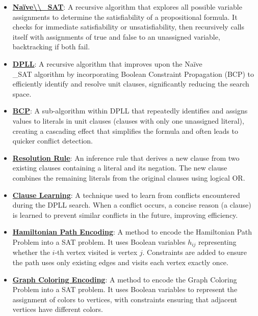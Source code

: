 \documentclass{article}%
\begin{document}
\begin{itemize}[leftmargin=*]%
\item \href{https://www.math.purdue.edu/~yipn/351/15L2-SAT.pdf#page=18}{\textbf{Naïve\textbackslash{}\textbackslash{}\_SAT}}: A recursive algorithm that explores all possible variable assignments to determine the satisfiability of a propositional formula. It checks for immediate satisfiability or unsatisfiability, then recursively calls itself with assignments of true and false to an unassigned variable, backtracking if both fail.%
\item \href{https://www.math.purdue.edu/~yipn/351/15L2-SAT.pdf#page=17}{\textbf{DPLL}}: A recursive algorithm that improves upon the Naïve\\_SAT algorithm by incorporating Boolean Constraint Propagation (BCP) to efficiently identify and resolve unit clauses, significantly reducing the search space.%
\item \href{https://www.math.purdue.edu/~yipn/351/15L2-SAT.pdf#page=20}{\textbf{BCP}}: A sub-algorithm within DPLL that repeatedly identifies and assigns values to literals in unit clauses (clauses with only one unassigned literal), creating a cascading effect that simplifies the formula and often leads to quicker conflict detection.%
\item \href{https://www.math.purdue.edu/~yipn/351/15L2-SAT.pdf#page=32}{\textbf{Resolution Rule}}: An inference rule that derives a new clause from two existing clauses containing a literal and its negation. The new clause combines the remaining literals from the original clauses using logical OR.%
\item \href{https://www.math.purdue.edu/~yipn/351/15L2-SAT.pdf#page=35}{\textbf{Clause Learning}}: A technique used to learn from conflicts encountered during the DPLL search. When a conflict occurs, a concise reason (a clause) is learned to prevent similar conflicts in the future, improving efficiency.%
\item \href{https://www.math.purdue.edu/~yipn/351/15L2-SAT.pdf#page=46}{\textbf{Hamiltonian Path Encoding}}: A method to encode the Hamiltonian Path Problem into a SAT problem. It uses Boolean variables $h_{ij}$ representing whether the $i$-th vertex visited is vertex $j$. Constraints are added to ensure the path uses only existing edges and visits each vertex exactly once.%
\item \href{https://www.math.purdue.edu/~yipn/351/15L2-SAT.pdf#page=47}{\textbf{Graph Coloring Encoding}}: A method to encode the Graph Coloring Problem into a SAT problem. It uses Boolean variables to represent the assignment of colors to vertices, with constraints ensuring that adjacent vertices have different colors.%
\end{itemize}%
\end{document}
